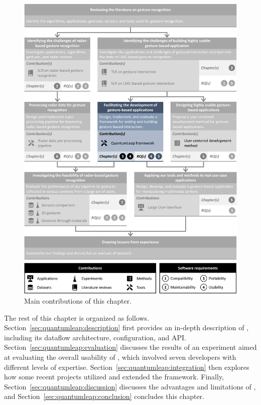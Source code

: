 \begin{figure}
    \centering
    \includegraphics[width=\linewidth]{Figures/QuantumLeap/graphical-summary-quantumleap.pdf}
    \vspace{-18pt}
    \caption{Main contributions of this chapter.}
    \label{fig:quantumleap:graphical-summary}
\end{figure}

The rest of this chapter is organized as follows. Section~\ref{sec:quantumleap:description} first provides an in-depth description of \ql, including its dataflow architecture, configuration, and API.
Section~\ref{sec:quantumleap:evaluation} discusses the results of an experiment aimed at evaluating the overall usability of \ql, which involved seven developers with different levels of expertise.
Section~\ref{sec:quantumleap:integration} then explores how some recent projects utilized and extended the framework.
Finally, Section~\ref{sec:quantumleap:discussion} discusses the advantages and limitations of \ql, and Section~\ref{sec:quantumleap:conclusion} concludes this chapter.

